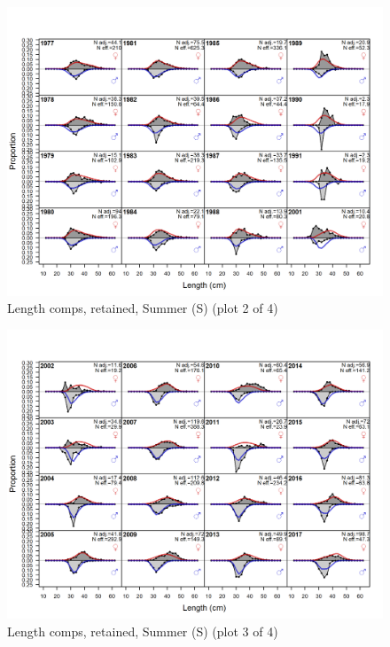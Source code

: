 \documentclass[12pt,]{article}
\begin{document}
\begin{figure}
\centering
\includegraphics{r4ss/plots_mod1/comp_lenfit_flt4mkt2_page2.png}
\caption{Length comps, retained, Summer (S) (plot 2 of 4)
\label{fig:length_fits}}
\end{figure}

\begin{figure}
\centering
\includegraphics{r4ss/plots_mod1/comp_lenfit_flt4mkt2_page3.png}
\caption{Length comps, retained, Summer (S) (plot 3 of 4)
\label{fig:length_fits}}
\end{figure}
\end{document}
